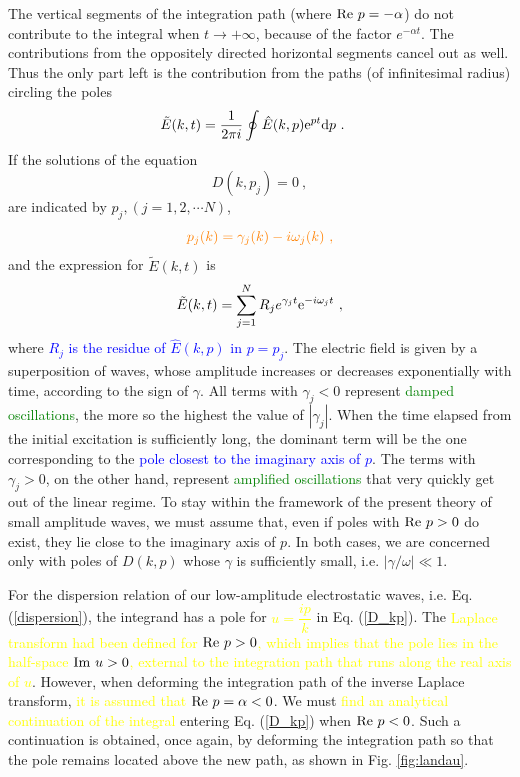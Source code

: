 \documentclass[12pt,a4paper]{article}
\newcommand{\dif}{\mathrm{d}}
\begin{document}
The vertical segments of the integration path (where ${\rm Re}~ p = -\alpha$) do not contribute to the integral when $t \rightarrow +\infty$, because of the factor $e^{-\alpha t}$. The contributions from the oppositely directed horizontal segments cancel out as well. Thus the only part left is the contribution from the paths (of infinitesimal radius) circling the poles
\begin{align}
\tilde{E}(k, t) &= \frac{1}{2\pi i}  \oint \hat{E}(k, p) {\rm e}^{pt} \dif p ~.
\end{align}
If the solutions of the equation
\begin{equation}
D(k, p_j) = 0 ~,
\label{dispersion}
\end{equation}
are indicated by $p_j, (j = 1, 2, \cdots N)$, 
\begin{equation*}
\color{orange} p_j(k) = \gamma_j(k) -i\omega_j (k) ~,
\end{equation*}
and the expression for $\tilde{E}(k, t)$ is
\begin{equation}
\tilde{E}(k, t) = \sum_{j=1}^N R_j {\rm} e^{\gamma_j t} {\rm e}^{-i \omega_j t} ~,
\label{E_kt_residue}
\end{equation}
where \textcolor{blue}{$R_j$ is the residue of $\hat{E}(k, p)$ in $p = p_j$}. The electric field is given by a superposition of waves, whose amplitude increases or decreases exponentially with time, according to the sign of $\gamma$. All terms with $\gamma_j < 0$ represent \textcolor{green}{damped oscillations}, the more so the highest the value of $|\gamma_j|$. When the time elapsed from the initial excitation is sufficiently long, the dominant term will be the one corresponding to the \textcolor{blue}{pole closest to the imaginary axis of $p$}. The terms with $\gamma_j > 0$, on the other hand, represent \textcolor{green}{amplified oscillations} that very quickly get out of the linear regime. To stay within the framework of the present theory of small amplitude waves, we must assume that, even if poles with ${\rm Re}~ p > 0$ do exist, they lie close to the imaginary axis of $p$. In both cases, we are concerned only with poles of $D(k, p)$ whose $\gamma$ is sufficiently small, i.e. $|\gamma /\omega| \ll 1$.

For the dispersion relation of our low-amplitude electrostatic waves, i.e. Eq. (\ref{dispersion}), the integrand has a pole for \textcolor{yellow}{$u = \dfrac{ip}{k}$} in Eq. (\ref{D_kp}). The \textcolor{yellow}{Laplace transform had been defined for ${\rm Re}~ p > 0$, which implies that the pole lies in the half-space ${\rm Im}~ u > 0$, external to the integration path that runs along the real axis of $u$}. However, when deforming the integration path of the inverse Laplace transform, \textcolor{yellow}{it is assumed that ${\rm Re}~ p = \alpha < 0$}. We must \textcolor{yellow}{find an analytical continuation of the integral} entering Eq. (\ref{D_kp}) when ${\rm Re}~ p < 0$. Such a continuation is obtained, once again, by deforming the integration path so that the pole remains located above the new path, as shown in Fig. \ref{fig:landau}.
\end{document}
